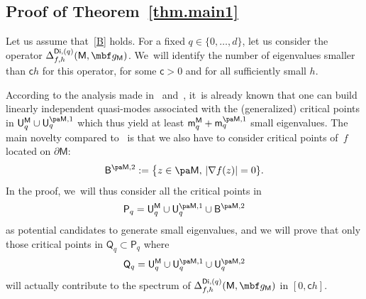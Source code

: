 \subsection{Proof of Theorem~\ref{thm.main1}}\label{sec.numb-small}
Let us assume that~\ref{B} holds.
For a fixed $q\in \{0,\ldots,d\}$, let us consider the operator $\Delta_{f,h}^{\mathsf{Di},(q)}(\mathsf M,\mbf g_{\mathsf M})$. We~will identify the number of eigenvalues smaller than $\mathsf c h$ for
this operator, for some $\mathsf c>0$ and for all
sufficiently small $h$.

According to the analysis made in~\cite[Chap.\,3]{helffer-nier-06}
and~\cite{helffer-sjostrand-85}, it~is already known that one can build linearly
independent quasi-modes associated with
the (generalized) critical points in $\mathsf U_q^{\mathsf M}\cup \mathsf U^{\pa \mathsf M,1}_q$ which thus yield
at least $\mathsf m_q^{\mathsf M}+\mathsf m_q^{\pa \mathsf M,1}$
small eigenvalues. The main novelty compared
to~\cite[Chap.\,3]{helffer-nier-06} is that we also have to consider critical
points of~$f$ located on $\partial \mathsf M$:
\begin{equation}\label{eq.defB}
\mathsf B^{\pa \mathsf M,2}:=\big \{z \in \pa \mathsf M, \, \vert \nabla f(z)\vert =0 \}.
\end{equation}
In the proof, we~will thus consider all the critical points in
\[
\mathsf P_q= \mathsf U_q^{\mathsf M}\cup \mathsf U^{\pa \mathsf M,1}_q\cup \mathsf B^{\pa \mathsf M,2}
\]
as potential candidates to generate small eigenvalues, and we will prove
that only those critical points in $\mathsf Q_q \subset \mathsf P_q$ where
\[
\mathsf Q_q= \mathsf U_q^{\mathsf M}\cup \mathsf U^{\pa \mathsf M,1}_q\cup \mathsf U^{\pa \mathsf M,2}_q
\]
will actually contribute to the spectrum of
$\Delta_{f,h}^{\mathsf{Di},(q)}(\mathsf M,\mbf g_{\mathsf M})$ in
$[0,\mathsf ch]$.

